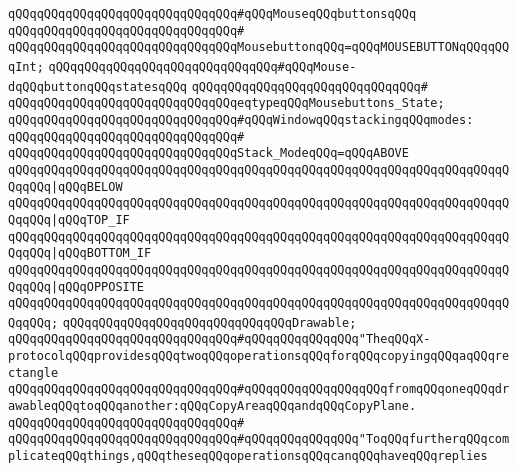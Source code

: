 \newline
\verb|qQQqqQQqqQQqqQQqqQQqqQQqqQQqqQQq#qQQqMouseqQQqbuttonsqQQq|\newline
\verb|qQQqqQQqqQQqqQQqqQQqqQQqqQQqqQQq#|\newline
\verb|qQQqqQQqqQQqqQQqqQQqqQQqqQQqqQQqMousebuttonqQQq=qQQqMOUSEBUTTONqQQqqQQqInt;|\newline
\newline
\verb|qQQqqQQqqQQqqQQqqQQqqQQqqQQqqQQq#qQQqMouse-dqQQqbuttonqQQqstatesqQQq|\newline
\verb|qQQqqQQqqQQqqQQqqQQqqQQqqQQqqQQq#|\newline
\verb|qQQqqQQqqQQqqQQqqQQqqQQqqQQqqQQqeqtypeqQQqMousebuttons_State;|\newline
\newline
\verb|qQQqqQQqqQQqqQQqqQQqqQQqqQQqqQQq#qQQqWindowqQQqstackingqQQqmodes:|\newline
\verb|qQQqqQQqqQQqqQQqqQQqqQQqqQQqqQQq#|\newline
\verb|qQQqqQQqqQQqqQQqqQQqqQQqqQQqqQQqStack_ModeqQQq=qQQqABOVE|\newline
\verb|qQQqqQQqqQQqqQQqqQQqqQQqqQQqqQQqqQQqqQQqqQQqqQQqqQQqqQQqqQQqqQQqqQQqqQQqqQQq|\verb#|qQQqBELOW#\newline
\verb|qQQqqQQqqQQqqQQqqQQqqQQqqQQqqQQqqQQqqQQqqQQqqQQqqQQqqQQqqQQqqQQqqQQqqQQqqQQq|\verb#|qQQqTOP_IF#\newline
\verb|qQQqqQQqqQQqqQQqqQQqqQQqqQQqqQQqqQQqqQQqqQQqqQQqqQQqqQQqqQQqqQQqqQQqqQQqqQQq|\verb#|qQQqBOTTOM_IF#\newline
\verb|qQQqqQQqqQQqqQQqqQQqqQQqqQQqqQQqqQQqqQQqqQQqqQQqqQQqqQQqqQQqqQQqqQQqqQQqqQQq|\verb#|qQQqOPPOSITE#\newline
\verb|qQQqqQQqqQQqqQQqqQQqqQQqqQQqqQQqqQQqqQQqqQQqqQQqqQQqqQQqqQQqqQQqqQQqqQQqqQQq;|\newline
\newline
\verb|qQQqqQQqqQQqqQQqqQQqqQQqqQQqqQQqDrawable;|\newline
\newline
\verb|qQQqqQQqqQQqqQQqqQQqqQQqqQQqqQQq#qQQqqQQqqQQqqQQq"TheqQQqX-protocolqQQqprovidesqQQqtwoqQQqoperationsqQQqforqQQqcopyingqQQqaqQQqrectangle|\newline
\verb|qQQqqQQqqQQqqQQqqQQqqQQqqQQqqQQq#qQQqqQQqqQQqqQQqqQQqfromqQQqoneqQQqdrawableqQQqtoqQQqanother:qQQqCopyAreaqQQqandqQQqCopyPlane.|\newline
\verb|qQQqqQQqqQQqqQQqqQQqqQQqqQQqqQQq#|\newline
\verb|qQQqqQQqqQQqqQQqqQQqqQQqqQQqqQQq#qQQqqQQqqQQqqQQq"ToqQQqfurtherqQQqcomplicateqQQqthings,qQQqtheseqQQqoperationsqQQqcanqQQqhaveqQQqreplies|\newline
